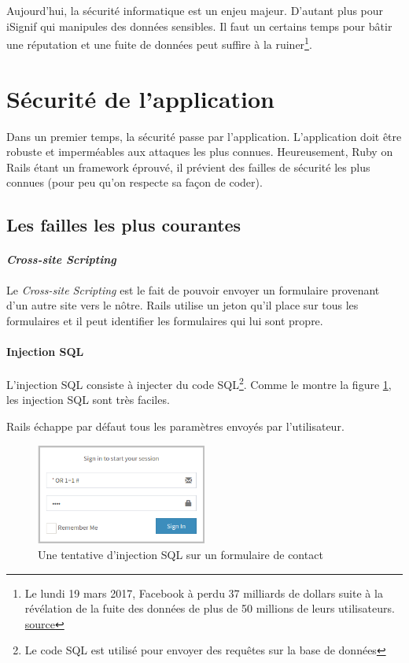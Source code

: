 \documentclass[]{report}
\begin{document}
  Aujourd'hui, la sécurité informatique est un enjeu majeur. D'autant plus pour iSignif qui manipules des données sensibles. Il faut un certains temps pour bâtir une réputation et une fuite de données peut suffire à la ruiner\footnote{Le lundi 19 mars 2017, Facebook à perdu 37 milliards de dollars suite à la révélation de la fuite des données de plus de 50 millions de leurs utilisateurs.  \href{https://www.lci.fr/high-tech/affaire-cambridge-analytica-quel-est-ce-scandale-qui-plonge-facebook-dans-la-crise-mark-zuckerberg-2082228.html}{source}}.

  \section{Sécurité de l'application}

    Dans un premier temps, la sécurité passe par l'application. L'application doit être robuste et imperméables aux attaques les plus connues. Heureusement, Ruby on Rails étant un framework éprouvé, il prévient des failles de sécurité les plus connues (pour peu qu'on respecte sa façon de coder).

    \subsection{Les failles les plus courantes}


      \paragraph{\textit{Cross-site Scripting}}

        Le \textit{Cross-site Scripting} est le fait de pouvoir envoyer un formulaire provenant d'un autre site vers le nôtre. Rails utilise un jeton qu'il place sur tous les formulaires et il peut identifier les formulaires qui lui sont propre.

      \paragraph{Injection SQL}

        L'injection SQL consiste à injecter du code SQL\footnote{Le code SQL est utilisé pour envoyer des requêtes sur la base de données}. Comme le montre la figure \ref{fig:sql_injection}, les injection SQL sont très faciles.

        Rails échappe par défaut tous les paramètres envoyés par l’utilisateur.

        \begin{figure}
          \centering
          \includegraphics[width=0.5\textwidth]{img/sql_injection.png}
          \caption{Une tentative d'injection SQL sur un formulaire de contact}
          \label{fig:sql_injection}
        \end{figure}
\end{document}

